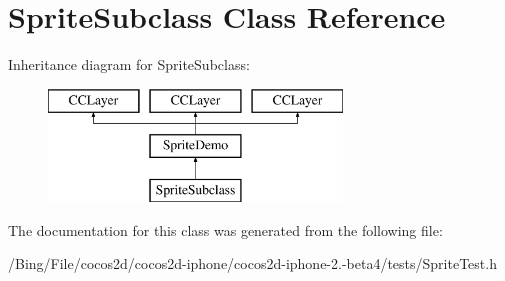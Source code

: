 \hypertarget{interface_sprite_subclass}{\section{Sprite\-Subclass Class Reference}
\label{interface_sprite_subclass}
}
Inheritance diagram for Sprite\-Subclass\-:\begin{figure}[H]
\begin{center}
\leavevmode
\includegraphics[height=3.000000cm]{interface_sprite_subclass}
\end{center}
\end{figure}


The documentation for this class was generated from the following file\-:\begin{DoxyCompactItemize}
\item 
/\-Bing/\-File/cocos2d/cocos2d-\/iphone/cocos2d-\/iphone-\/2.-\/beta4/tests/Sprite\-Test.\-h\end{DoxyCompactItemize}
